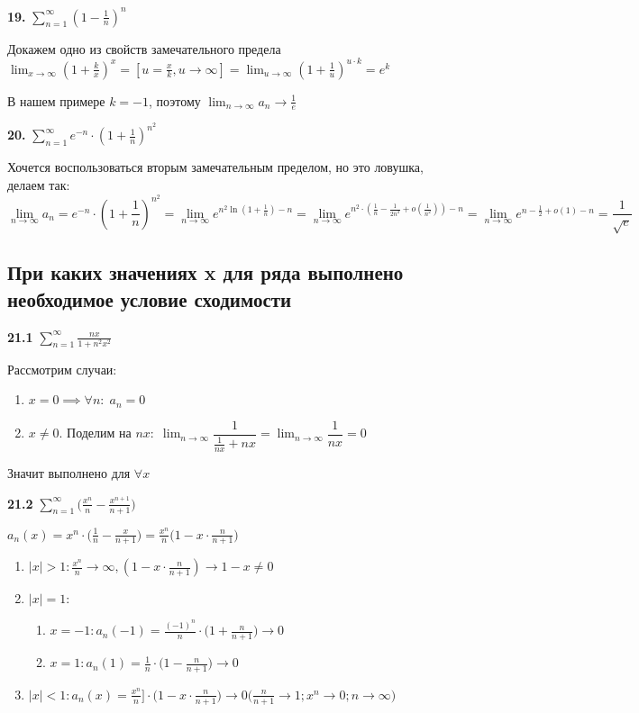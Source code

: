 \textbf{19.} $\sum_{n=1}^{\infty} \left(1 - \frac{1}{n}\right)^n$

Докажем одно из свойств замечательного предела $\lim_{x \to \infty} \left(1 + \frac{k}{x}\right)^x = [ u = \frac{x}{k}, u\to \infty ] =\lim_{u \to \infty} \left(1 + \frac{1}{u}\right)^{u\cdot k} = e^k$

В нашем примере $k = -1$, поэтому $\lim_{n \to \infty} a_n \to \frac{1}{e}$

\textbf{20.} $\sum_{n=1}^{\infty} e^{-n}\cdot \left(1 + \frac{1}{n}\right)^{n^2}$

Хочется воспользоваться вторым замечательным пределом, но это ловушка, делаем так: $$\lim_{n \to \infty} a_n = e^{-n}\cdot \left(1 + \frac{1}{n}\right)^{n^2} = \lim_{n \to \infty} e^{n^2\ln{\left(1 + \frac{1}{n}\right)} - n} = \lim_{n \to \infty} e^{n^2\cdot \left(\frac{1}{n} - \frac{1}{2n^2} + o\left(\frac{1}{n^2}\right)\right) - n} =\lim_{n \to \infty} e^{n - \frac{1}{2} + o(1) - n} = \frac{1}{\sqrt{e}}$$

\subsection{При каких значениях x для ряда выполнено необходимое условие сходимости}

\textbf{21.1} $\sum_{n=1}^{\infty} \frac{nx}{1+n^2x^2}$

Рассмотрим случаи:
\begin{enumerate}
	\item $x = 0 \implies \forall n:\; a_n = 0$
	\item $x \neq 0$. Поделим на $nx:\; \lim_{n \to \infty} \dfrac{1}{\frac{1}{nx}+nx} = \lim_{n \to \infty} \dfrac{1}{nx} = 0$
\end{enumerate}

Значит выполнено для $\forall x$

\textbf{21.2} $\sum_{n=1}^{\infty} \Big( \frac{x^n}{n} - \frac{x^{n+1}}{n+1} \Big)$

$a_n(x)=x^{n}\cdot \Big( \frac{1}{n} - \frac{x}{n+1} \Big)=\frac{x^n}{n} \Big( 1-x \cdot \frac{n}{n+1} \Big)$

\begin{enumerate}
	\item $|x|>1: \frac{x^n}{n} \longrightarrow \infty, (1-x\cdot \frac{n}{n+1}) \longrightarrow 1-x \neq 0$
	\item $|x|=1: $ \begin{enumerate}
						\item $x=-1: a_n(-1)=\frac{(-1)^n}{n}\cdot \Big(1+\frac{n}{n+1}\Big) \longrightarrow 0$
						\item $x=1: a_n(1)=\frac{1}{n} \cdot \Big(1- \frac{n}{n+1}\Big) \longrightarrow 0$
					\end{enumerate}
	\item $|x|<1: a_n(x)=\frac{x^n}{n} ]\cdot \Big( 1- x \cdot \frac{n}{n+1} \Big) \longrightarrow 0 \Big( \frac{n}{n+1} \to 1; x^n \to 0; n \to \infty \Big)$
\end{enumerate}

